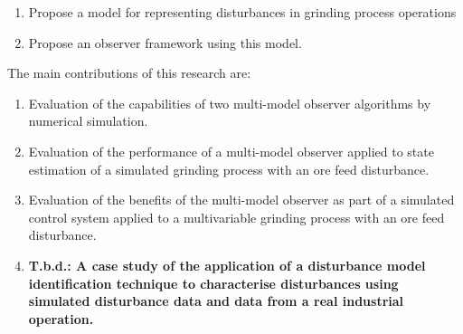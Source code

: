 \begin{enumerate}
	\item Propose a model for representing disturbances in grinding process operations
	\item Propose an observer framework using this model.
\end{enumerate}


The main contributions of this research are:

\begin{enumerate}
	\item Evaluation of the capabilities of two multi-model observer algorithms by numerical simulation.
	\item Evaluation of the performance of a multi-model observer applied to state estimation of a simulated grinding process with an ore feed disturbance.
	\item Evaluation of the benefits of the multi-model observer as part of a simulated control system applied to a multivariable grinding process with an ore feed disturbance.
	\item \textbf{T.b.d.: A case study of the application of a disturbance model identification technique to characterise disturbances using simulated disturbance data and data from a real industrial operation.}
\end{enumerate}

